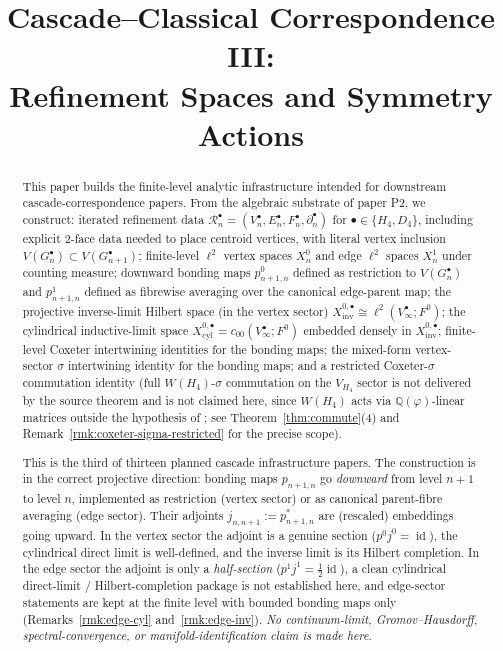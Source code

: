 \documentclass[11pt, a4paper]{amsart}
\title{Cascade--Classical Correspondence III:\\
  Refinement Spaces and Symmetry Actions}
\author{}
\date{}
\theoremstyle{definition}
\newcommand{\Q}{\mathbb{Q}}
\newcommand{\id}{\operatorname{id}}
\newcommand{\inv}{\mathrm{inv}}
\newcommand{\cyl}{\mathrm{cyl}}
\begin{document}
\maketitle

\begin{abstract}
This paper builds the finite-level analytic infrastructure
intended for downstream cascade-correspondence papers. From the
algebraic substrate of paper P2, we construct: iterated refinement
data $\mathcal{R}_n^\bullet = (V_n^\bullet, E_n^\bullet, F_n^\bullet,
\partial_n^\bullet)$ for $\bullet \in \{H_4, D_4\}$, including
explicit $2$-face data needed to place centroid vertices, with
literal vertex inclusion $V(G_n^\bullet) \subset V(G_{n+1}^\bullet)$;
finite-level $\ell^2$ vertex spaces $X_n^0$ and edge $\ell^2$
spaces $X_n^1$ under counting measure; downward bonding maps $p_{n+1, n}^0$ defined
as restriction to $V(G_n^\bullet)$ and $p_{n+1, n}^1$ defined as
fibrewise averaging over the canonical edge-parent map; the
projective inverse-limit Hilbert space (in the vertex sector)
$X_\inv^{0, \bullet} \cong \ell^2(V_\infty^\bullet; F^0)$; the
cylindrical inductive-limit space $X_\cyl^{0, \bullet} =
c_{00}(V_\infty^\bullet; F^0)$ embedded densely in
$X_\inv^{0, \bullet}$; finite-level Coxeter intertwining
identities for the bonding maps; the mixed-form vertex-sector
$\sigma$ intertwining identity for the bonding maps; and a
restricted Coxeter-$\sigma$ commutation identity (full
$W(H_4)$-$\sigma$ commutation on the $V_{H_4}$ sector is not
delivered by the source theorem and is not claimed here, since
$W(H_4)$ acts via $\Q(\varphi)$-linear matrices outside the
hypothesis of \cite[Theorem~\texttt{thm:pisigma-functorial}]{SigmaRationality};
see Theorem~\ref{thm:commute}(4) and
Remark~\ref{rmk:coxeter-sigma-restricted} for the precise scope).

This is the third of thirteen planned cascade infrastructure papers.
The construction is in the correct projective direction: bonding
maps $p_{n+1, n}$ go \emph{downward} from level $n+1$ to level $n$,
implemented as restriction (vertex sector) or as canonical
parent-fibre averaging (edge sector). Their adjoints
$j_{n, n+1} := p_{n+1, n}^*$ are (rescaled) embeddings going upward.
In the vertex sector the adjoint is a genuine section
($p^0 j^0 = \id$), the cylindrical direct limit is well-defined,
and the inverse limit is its Hilbert completion. In the edge sector
the adjoint is only a \emph{half-section} ($p^1 j^1 = \tfrac12 \id$),
a clean cylindrical direct-limit / Hilbert-completion package is
not established here, and edge-sector statements are kept at the
finite level with bounded bonding maps only
(Remarks~\ref{rmk:edge-cyl} and~\ref{rmk:edge-inv}). \emph{No continuum-limit, Gromov--Hausdorff,
spectral-convergence, or manifold-identification claim is made
here.}


\end{abstract}
\end{document}
